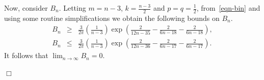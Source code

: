 \documentclass[11pt]{article}
\newenvironment{proof}{\noindent{\bf Proof:}\indent}%
                      {\hfill $\Box$\par}
\begin{document}
\begin{proof}


Now, consider $B_n$. Letting $m=n-3$, $k=\frac{n-3}{2}$ and $p=q=\frac{1}{2}$, from~\eqref{eqn-bin} and using some routine simplifications
        we obtain the following bounds on $B_n$.
\begin{eqnarray*}
	B_n & \geq & \frac{3}{2\pi}\left(\frac{1}{n-3}\right)\exp\left(\frac{2}{12n-35}-\frac{2}{6n-18}-\frac{2}{6n-18}\right), \\
	B_n & \leq & \frac{3}{2\pi}\left(\frac{1}{n-3}\right)\exp\left(\frac{2}{12n-36}-\frac{2}{6n-17}-\frac{2}{6n-17}\right).
\end{eqnarray*}
It follows that $\lim_{n\to\infty}B_n=0$.

\end{proof}



\end{document}

